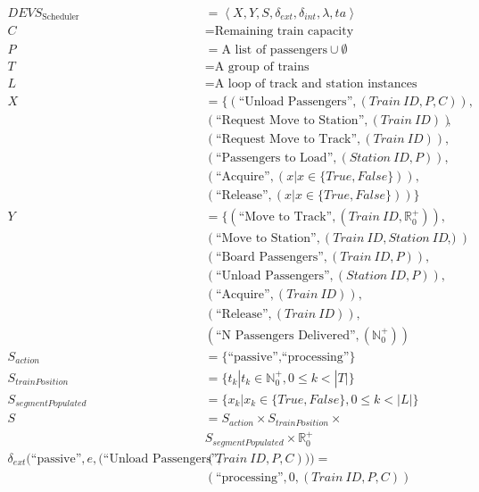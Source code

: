 \begin{align*} DEVS_{\textrm{Scheduler}} &= \left<X,Y,S,\delta_{ext},\delta_{int},\lambda,ta\right> \\
C &= \text{Remaining train capacity} \\
P &= \text{A list of passengers}\cup\emptyset \\
T &= \text{A group of trains} \\
L &= \text{A loop of track and station instances} \\
X &= \lbrace (\text{``Unload Passengers''},(Train\ ID, P, C)), \\
 & (\text{``Request Move to Station''},(Train\ ID)), \\
 & (\text{``Request Move to Track''},(Train\ ID)), \\
 & (\text{``Passengers to Load''},(Station\ ID, P)), \\
 & (\text{``Acquire''},(x|x\in\lbrace True,False\rbrace)), \\
 & (\text{``Release''},(x|x\in\lbrace True,False\rbrace))\rbrace \\
Y &= \lbrace(\text{``Move to Track''},(Train\ ID,\mathbb{R}_0^+)), \\
 & (\text{``Move to Station''},(Train\ ID, Station\ ID)), \\
 & (\text{``Board Passengers''},(Train\ ID, P)), \\
 & (\text{``Unload Passengers''},(Station\ ID, P)), \\
 & (\text{``Acquire''},(Train\ ID)), \\
 & (\text{``Release''},(Train\ ID)), \\
 & (\text{``N Passengers Delivered''},(\mathbb{N}_0^+)) \\
S_{action} &= \lbrace \text{``passive'',``processing''}\rbrace \\
S_{trainPosition} &= \lbrace t_k|t_k\in\mathbb{N}_0^+, 0\leq k<|T|\rbrace \\
S_{segmentPopulated} &= \lbrace x_k|x_k\in\lbrace True,False\rbrace, 0\leq k<|L|\rbrace \\
S &= S_{action}\times S_{trainPosition}\times \\
 & S_{segmentPopulated}\times\mathbb{R}_0^+ \\
\delta_{ext}(\text{``passive''},e,(\text{``Unload Passengers''},&(Train\ ID,P,C))) = \\ &(\text{``processing''},0,(Train\ ID,P,C)) \\

\end{align*}

